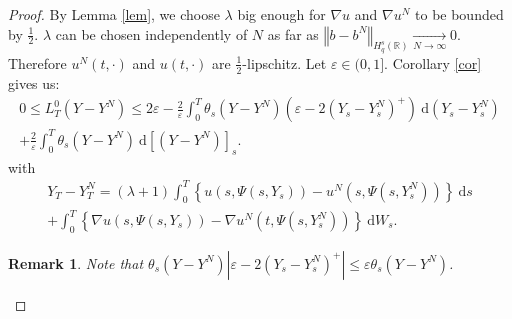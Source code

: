 \documentclass[12pt]{article}
\newtheorem{rem}{Remark}
\newcommand{\norme}[1]{\left\Vert #1\right\Vert}
\newcommand{\R}{\mathbb{R}}
\newcommand{\di}{\mathrm{d}}
\begin{document}
\begin{proof}
    By Lemma \ref{lem}, we choose $\lambda$ big enough for $\nabla u$ and $\nabla u^N$ to be bounded by $\frac{1}{2}$. $\lambda$ can be chosen independently of $N$ as far as $\norme{b - b^N}_{H_q^s(\R)} \underset{N\rightarrow\infty}{\longrightarrow} 0$. Therefore $u^N(t,\cdot)$ and $u(t,\cdot)$ are $\frac{1}{2}$-lipschitz. 
    Let $\varepsilon\in(0,1]$. Corollary \ref{cor} gives us:    
    \begin{multline*}
    0\leq L^0_T(Y-Y^N) \leq 2\varepsilon - \frac{2}{\varepsilon}\int_0^T \theta_s(Y-Y^N) \left(\varepsilon - 2{(Y_s-Y_s^N)^+}\right)\ \di (Y_s-Y_s^N)\\
    +\frac{2}{\varepsilon}\int_0^T \theta_s(Y-Y^N) \ \di[(Y-Y^N)]_s.
    \end{multline*}    
    with
    \begin{multline*}    
    Y_T-Y_T^N = (\lambda + 1 )\int_0^T\left\{u\left(s,\Psi\left(s,Y_s\right)\right)-u^N\left(s,\Psi\left(s,Y_s^N\right)\right)\right\}\ \di s\\ + \int_0^T\left\{\nabla u\left(s,\Psi\left(s,Y_s\right)\right)-\nabla u^N\left(t,\Psi\left(s,Y_s^N\right)\right)\right\}\ \di W_s.
    \end{multline*}    
    \begin{rem}
        Note that $\theta_s(Y-Y^N) \left|\varepsilon - 2{(Y_s-Y_s^N)^+}\right|\leq \varepsilon\theta_s(Y-Y^N)$.
    \end{rem}


\end{proof}
\end{document}
